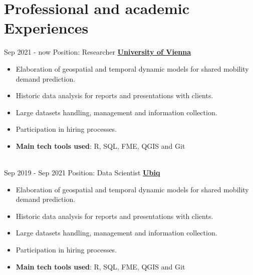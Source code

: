 \documentclass[letterpaper]{twentysecondcv} %
\begin{document}
\makeprofile %
 

\section{Professional and academic Experiences}

\begin{twenty} %
\twentyitem
    	{Sep 2021 -}
		{now}
        {Position: Researcher} 
        {\href{https://geographie.univie.ac.at/arbeitsgruppen/engage-geomorphologische-systeme-und-risikoforschung/}{\textbf{University of Vienna}}}
        {}
        {\begin{itemize}
        \item Elaboration of geospatial and temporal dynamic models for shared mobility demand prediction.
        \item Historic data analysis for reports and presentations with clients.
        \item Large datasets handling, management and information collection. 
        \item Participation in hiring processes. 
        \item \textbf{Main tech tools used}: R, SQL, FME, QGIS and Git
        \end{itemize}}
        \\

\twentyitem
    	{Sep 2019 -}
		{Sep 2021}
        {Position: Data Scientist} 
        {\href{http://www.ubiq.ai/}{\textbf{Ubiq}}}
        {}
        {\begin{itemize}
        \item Elaboration of geospatial and temporal dynamic models for shared mobility demand prediction.
        \item Historic data analysis for reports and presentations with clients.
        \item Large datasets handling, management and information collection. 
        \item Participation in hiring processes. 
        \item \textbf{Main tech tools used}: R, SQL, FME, QGIS and Git
        \end{itemize}}
        \\
	

\end{twenty}
\end{document}
